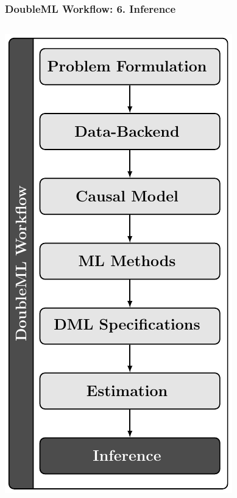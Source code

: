 \begin{frame}[fragile]
\frametitle{DoubleML Workflow: 6. Inference}
\begin{columns}
\begin{column}{0.3\textwidth}
\includegraphics[width = \textwidth]{workflow/doubleml_workflow_inf.pdf}

\end{column}
\end{columns}
\end{frame}
